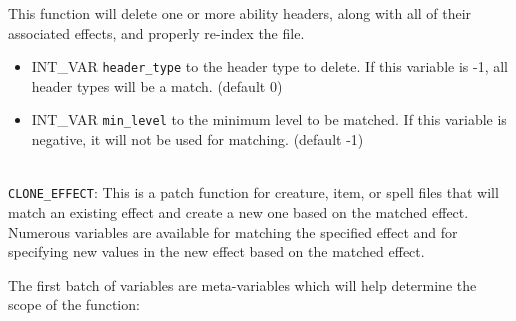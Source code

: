 \documentclass{article}
\begin{document}
This function will delete one or more ability headers, along with all of their associated effects, and properly re-index the file.

\begin{itemize}
\item INT_VAR \verb+header_type+ to the header type to delete. If this variable is -1, all header types will be a match. (default 0)
\item INT_VAR \verb+min_level+ to the minimum level to be matched. If this variable is negative, it will not be used for matching. (default -1)
\end{itemize}
\\

\verb+CLONE_EFFECT+: This is a patch function for creature, item, or spell files that will match an existing effect and create a new one based on the matched effect. Numerous variables are available for matching the specified effect and for specifying new values in the new effect based on the matched effect.

The first batch of variables are meta-variables which will help determine the scope of the function:
\end{document}
